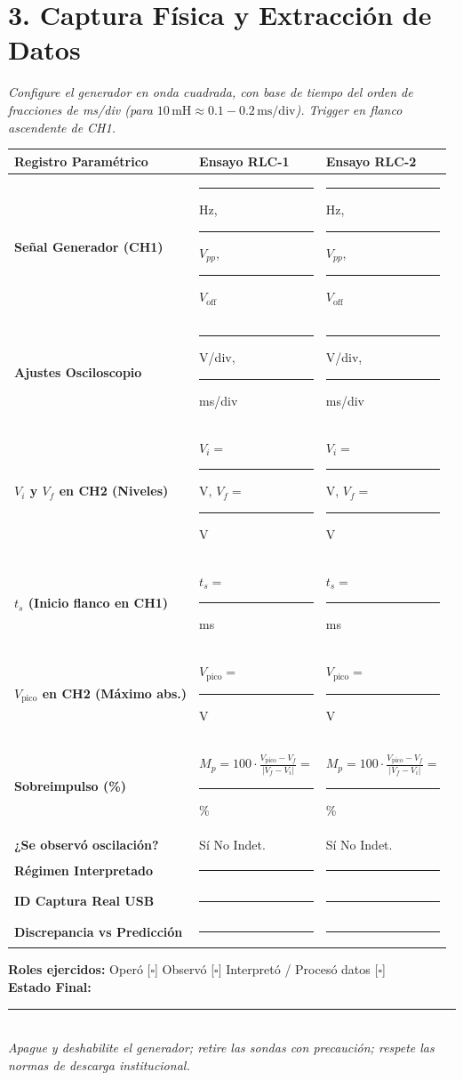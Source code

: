 \documentclass[11pt, a4paper]{article}
\begin{document}
\section*{3. Captura Física y Extracción de Datos}
\textit{Configure el generador en onda cuadrada, con base de tiempo del orden de fracciones de ms/div (para $10\,\text{mH} \approx 0.1-0.2\,\text{ms/div}$). Trigger en flanco ascendente de CH1.}

\vspace{0.2cm}
\renewcommand{\arraystretch}{1.5}
\noindent
\begin{tabularx}{\textwidth}{
  >{\bfseries\RaggedRight\hsize=0.9\hsize}X 
  >{\RaggedRight\arraybackslash\hsize=1.05\hsize}X 
  >{\RaggedRight\arraybackslash\hsize=1.05\hsize}X}
\toprule
\textbf{Registro Paramétrico} & \textbf{Ensayo RLC-1} & \textbf{Ensayo RLC-2} \\ 
\midrule
Señal Generador (CH1) & \rule{1.5cm}{0.4pt} Hz, \rule{1.5cm}{0.4pt} $V_{pp}$, \rule{1.5cm}{0.4pt} $V_{\text{off}}$ & \rule{1.5cm}{0.4pt} Hz, \rule{1.5cm}{0.4pt} $V_{pp}$, \rule{1.5cm}{0.4pt} $V_{\text{off}}$ \\ \addlinespace
Ajustes Osciloscopio & \rule{1.5cm}{0.4pt} V/div, \rule{1.5cm}{0.4pt} ms/div & \rule{1.5cm}{0.4pt} V/div, \rule{1.5cm}{0.4pt} ms/div \\ \addlinespace
$V_i$ y $V_f$ en CH2 (Niveles) & $V_i=$\rule{1.5cm}{0.4pt} V, $V_f=$\rule{1.5cm}{0.4pt} V & $V_i=$\rule{1.5cm}{0.4pt} V, $V_f=$\rule{1.5cm}{0.4pt} V \\ \addlinespace
$t_s$ (Inicio flanco en CH1) & $t_s=$\rule{2cm}{0.4pt} ms & $t_s=$\rule{2cm}{0.4pt} ms \\ \addlinespace
$V_{\text{pico}}$ en CH2 (Máximo abs.) & $V_{\text{pico}}=$\rule{2cm}{0.4pt} V & $V_{\text{pico}}=$\rule{2cm}{0.4pt} V \\ \addlinespace
Sobreimpulso (\%) & $M_p = 100 \cdot \frac{V_{\text{pico}} - V_f}{|V_f - V_i|} = $ \rule{1.5cm}{0.4pt} \% & $M_p = 100 \cdot \frac{V_{\text{pico}} - V_f}{|V_f - V_i|} = $ \rule{1.5cm}{0.4pt} \% \\ \addlinespace
¿Se observó oscilación? & [ ] Sí \quad [ ] No \quad [ ] Indet. & [ ] Sí \quad [ ] No \quad [ ] Indet. \\ \addlinespace
Régimen Interpretado & \rule{4cm}{0.4pt} & \rule{4cm}{0.4pt} \\ \addlinespace
ID Captura Real USB & \rule{4cm}{0.4pt} & \rule{4cm}{0.4pt} \\ \addlinespace
Discrepancia vs Predicción & \rule{4cm}{0.4pt} & \rule{4cm}{0.4pt} \\ 
\bottomrule
\end{tabularx}

\vspace{0.4cm}
\begin{tcolorbox}[colback=white, colframe=black, title=\textbf{Trazabilidad Individual y Cierre de Estación}]
\textbf{Roles ejercidos:} Operó [$\square$] \quad Observó [$\square$] \quad Interpretó / Procesó datos [$\square$] \\
\textbf{Estado Final:} \rule{10cm}{0.4pt} \\
\textit{Apague y deshabilite el generador; retire las sondas con precaución; respete las normas de descarga institucional.}
\end{tcolorbox}
\end{document}
